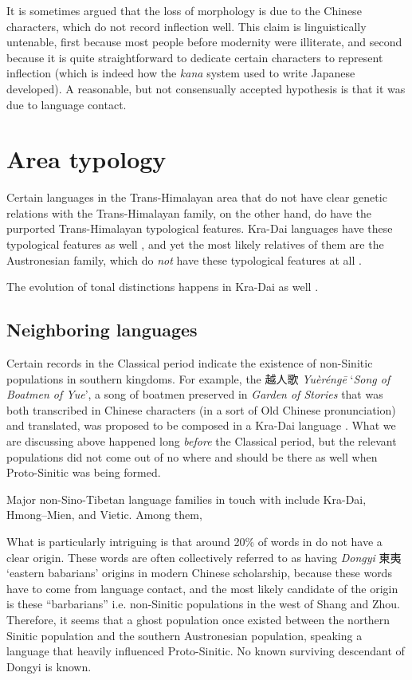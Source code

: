 \documentclass[UTF8, a4paper, oneside, scheme=plain, 12pt]{ctexrep}
\newcommand*{\citepage}[1]{p.~{#1}}
\newcommand{\form}[1]{\emph{#1}}
\newcommand{\work}[1]{\textit{#1}}
\newcommand{\translate}[1]{`#1'}
\begin{document}
It is sometimes argued that the loss of morphology is due to the Chinese characters,
which do not record inflection well.
This claim is linguistically untenable,
first because most people before modernity were illiterate,
and second because it is quite straightforward to dedicate certain characters to represent inflection
(which is indeed how the \form{kana} system used to write Japanese developed).
A reasonable, but not consensually accepted hypothesis is that it was due to language contact.

\section{Area typology}

Certain languages in the Trans-Himalayan area that do not have clear genetic relations with the Trans-Himalayan family, on the other hand,
do have the purported Trans-Himalayan typological features.
Kra-Dai languages have these typological features as well \citep[\citepage{434}]{sidwell2021languages},
and yet the most likely relatives of them are the Austronesian family,
which do \emph{not} have these typological features at all \citep{sagart2004higher,ostapirat2005notes}.

The evolution of tonal distinctions happens in Kra-Dai as well \citep{sagart2019model}.

\subsection{Neighboring languages}

Certain records in the Classical period indicate the existence of non-Sinitic populations in southern kingdoms.
For example, the 越人歌 \form{Yuèréngē} \translate{\work{Song of Boatmen of Yue}},
a song of boatmen preserved in \work{Garden of Stories} that was both transcribed in Chinese characters (in a sort of Old Chinese pronunciation) and translated,
was proposed to be composed in a Kra-Dai language \citep{zhengzhang1991decipherment}.
What we are discussing above happened long \emph{before} the Classical period,
but the relevant populations did not come out of no where
and should be there as well when Proto-Sinitic was being formed.

Major non-Sino-Tibetan language families in touch with 
include Kra-Dai, Hmong–Mien, and Vietic.
Among them, 

What is particularly intriguing is that around 20\% of words in \citet{mccraw2010lexical} do not have a clear origin.
These words are often collectively referred to as having \form{Dongyi} 東夷 \translate{eastern babarians} origins in modern Chinese scholarship,
because these words have to come from language contact,
and the most likely candidate of the origin is these ``barbarians'' i.e. non-Sinitic populations in the west of Shang and Zhou.
Therefore, it seems that a ghost population once existed between the northern Sinitic population and the southern Austronesian population,
speaking a language that heavily influenced Proto-Sinitic.
No known surviving descendant of Dongyi is known. 
\end{document}
